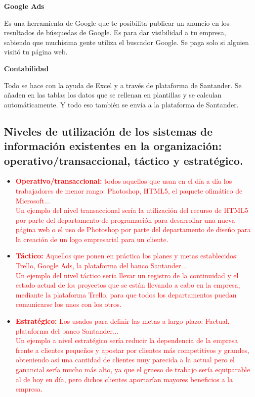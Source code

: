 \documentclass{article}
\begin{document}
\vspace{5mm}

\textbf{Google Ads}

Es una herramienta de Google que te posibilita publicar un anuncio en los resultados de búsquedas de Google. Es para dar visibilidad a tu empresa, sabiendo que muchísima gente utiliza el buscador Google. Se paga solo si alguien visitó tu página web. 

\vspace{5mm}

\textbf{Contabilidad}

Todo se hace con la ayuda de Excel y a través de plataforma de Santander. Se añaden en las tablas los datos que se rellenan en plantillas y se calculan automáticamente. Y todo eso también se envía a la plataforma de Santander. 

\subsection{Niveles de utilización de los sistemas de información existentes en la organización: operativo/transaccional, táctico y estratégico.}

\begin{itemize}
\item \textcolor{Red}{\textbf{Operativo/transaccional:} todos aquellos que usan en el día a día los trabajadores de menor rango: Photoshop, HTML5, el paquete ofimático de Microsoft...}\\
\textcolor{Red}{Un ejemplo del nivel transaccional sería la utilización del recurso de HTML5 por parte del departamento de programación para desarrollar una nueva página web o el uso de Photoshop por parte del departamento de diseño para la creación de un logo empresarial para un cliente.}
\item \textcolor{Red}{\textbf{Táctico:} Aquellos que ponen en práctica los planes y metas establecidos: Trello, Google Ads, la plataforma del banco Santander...}\\
\textcolor{Red}{Un ejemplo del nivel táctico sería llevar un registro de la continuidad y el estado actual de los proyectos que se están llevando a cabo en la empresa, mediante la plataforma Trello, para que todos los departamentos puedan comunicarse los unos con los otros.}
\item \textcolor{Red}{\textbf{Estratégico:} Los usados para definir las metas a largo plazo: Factual, plataforma del banco Santander...}\\
\textcolor{Red}{Un ejemplo a nivel estratégico sería reducir la dependencia de la empresa frente a clientes pequeños y apostar por clientes más competitivos y grandes, obteniendo así una cantidad de clientes muy parecida a la actual pero el ganancial sería mucho más alto, ya que el grueso de trabajo sería equiparable al de hoy en día, pero dichos clientes aportarían mayores beneficios a la empresa.}
\end{itemize}
\end{document}
